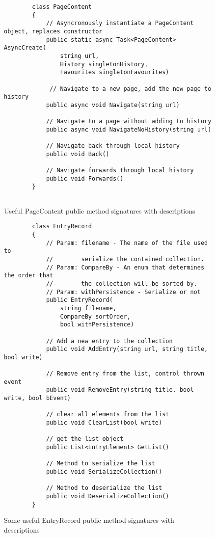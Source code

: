 \documentclass[../Main.tex]{subfiles}
\begin{document}
\begin{figure}[h]
    \begin{verbatim}
        class PageContent 
        {
            // Asyncronously instantiate a PageContent object, replaces constructor
            public static async Task<PageContent> AsyncCreate(
                string url,
                History singletonHistory, 
                Favourites singletonFavourites)
    
             // Navigate to a new page, add the new page to history
            public async void Navigate(string url)
    
            // Navigate to a page without adding to history
            public async void NavigateNoHistory(string url)
    
            // Navigate back through local history
            public void Back()
    
            // Navigate forwards through local history
            public void Forwards()
        }
        

    \end{verbatim}
    \caption{Useful PageContent public method signatures with descriptions}
    \label{fig:PageConentMethods}
\end{figure}

\begin{figure}[h]
    \begin{verbatim}
        class EntryRecord 
        {
            // Param: filename - The name of the file used to 
            //        serialize the contained collection.
            // Param: CompareBy - An enum that determines the order that 
            //        the collection will be sorted by.
            // Param: withPersistence - Serialize or not
            public EntryRecord(
                string filename, 
                CompareBy sortOrder, 
                bool withPersistence)

            // Add a new entry to the collection
            public void AddEntry(string url, string title, bool write)

            // Remove entry from the list, control thrown event
            public void RemoveEntry(string title, bool write, bool bEvent)

            // clear all elements from the list
            public void ClearList(bool write)

            // get the list object
            public List<EntryElement> GetList()

            // Method to serialize the list
            public void SerializeCollection()

            // Method to deserialize the list
            public void DeserializeCollection()
        }
    \end{verbatim}
    \caption{Some useful EntryRecord public method signatures with descriptions}
    \label{fig:EntryRecordMethods}
\end{figure}
\end{document}
